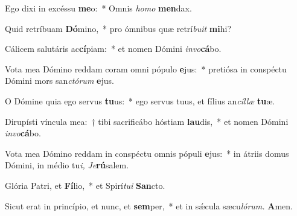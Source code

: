 \item Ego dixi in excéssu \textbf{me}o:~* Omnis \textit{homo} \textbf{men}dax.
\item Quid retríbuam \textbf{Dó}mino,~* pro ómnibus quæ retrí\textit{buit} \textbf{mi}hi?
\item Cálicem salutáris ac\textbf{cí}piam:~* et nomen Dómini \textit{invo}\textbf{cá}bo.
\item Vota mea Dómino reddam coram omni pópulo \textbf{e}jus:~* pretiósa in conspé\-ctu Dómini mors san\textit{ctórum} \textbf{e}jus.
\item O Dómine quia ego servus \textbf{tu}us:~* ego servus tuus, et fílius an\textit{cíllæ} \textbf{tu}æ.
\item Dirupísti víncula mea:~† tibi sacrificábo hóstiam \textbf{lau}dis,~* et nomen Dómini \textit{invo}\textbf{cá}bo.
\item Vota mea Dómino reddam in conspéctu omnis pópuli \textbf{e}jus:~* in átriis domus Dómini, in médio tu\tinyhspace\textit{i,} \hspace{0.02em}\textit{Je}\textbf{rú}salem.
\item Glória Patri, et \textbf{Fí}lio,~* et Spirí\tinyhspace\textit{tui} \textbf{San}cto.
\item Sicut erat in princípio, et nunc, et \textbf{sem}per,~* et in sǽcula sæcu\tinyhspace\textit{lórum.} \textbf{A}men.
